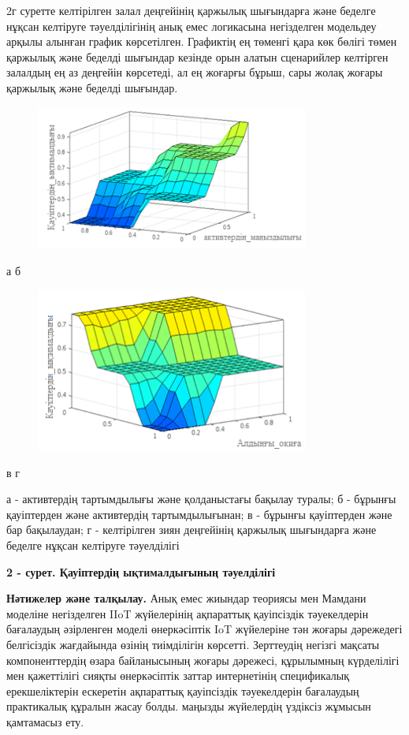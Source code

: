 2г суретте келтірілген залал деңгейінің қаржылық шығындарға және беделге
нұқсан келтіруге тәуелділігінің анық емес логикасына негізделген
модельдеу арқылы алынған график көрсетілген. Графиктің ең төменгі қара
көк бөлігі төмен қаржылық және беделді шығындар кезінде орын алатын
сценарийлер келтірген залалдың ең аз деңгейін көрсетеді, ал ең жоғарғы
бұрыш, сары жолақ жоғары қаржылық және беделді шығындар.

\begin{figure}[H]
	\centering
	\includegraphics[width=0.8\textwidth]{media/ict/image27}
	\caption*{}
\end{figure}


а б

\begin{figure}[H]
	\centering
	\includegraphics[width=0.8\textwidth]{media/ict/image29}
	\caption*{}
\end{figure}


в г

а - активтердің тартымдылығы және қолданыстағы бақылау туралы; б -
бұрынғы қауіптерден және активтердің тартымдылығынан; в - бұрынғы
қауіптерден және бар бақылаудан; г - келтірілген зиян деңгейінің
қаржылық шығындарға және беделге нұқсан келтіруге тәуелділігі

{\bfseries 2 - сурет. Қауіптердің ықтималдығының тәуелділігі}

{\bfseries Нәтижелер және талқылау.} Анық емес жиындар теориясы мен Мамдани
моделіне негізделген IIoT жүйелерінің ақпараттық қауіпсіздік
тәуекелдерін бағалаудың әзірленген моделі өнеркәсіптік IoT жүйелеріне
тән жоғары дәрежедегі белгісіздік жағдайында өзінің тиімділігін
көрсетті. Зерттеудің негізгі мақсаты компоненттердің өзара байланысының
жоғары дәрежесі, құрылымның күрделілігі мен қажеттілігі сияқты
өнеркәсіптік заттар интернетінің спецификалық ерекшеліктерін ескеретін
ақпараттық қауіпсіздік тәуекелдерін бағалаудың практикалық құралын жасау
болды. маңызды жүйелердің үздіксіз жұмысын қамтамасыз ету.

